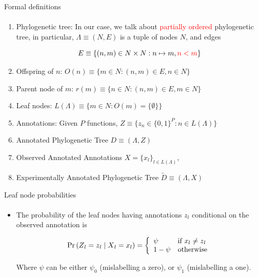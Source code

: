 \documentclass[9pt,handout,ignorenonframetext,]{beamer}
\newcommand{\Prcond}[2]{{\mbox{Pr}\left(#1\vphantom{#2}\;\right|\left.\vphantom{#1}#2\right)}}
\newcommand{\phylo}{\Lambda{}} %
\newcommand{\aphylo}{D{}}      %
\newcommand{\aphyloObs}{\tilde \aphylo{}} %
\newcommand{\Ann}{Z{}} %
\newcommand{\ann}{z{}} %
\newcommand{\AnnObs}{X{}}
\newcommand{\annObs}{x{}}
\newcommand{\Leaf}{L{}}
\begin{document}
\begin{frame}[t,label=formaldef]{Formal definitions}

\framesubtitle{\hyperlink{definitions}{}}

\begin{enumerate}
\def\labelenumi{\arabic{enumi}.}
\item
  Phylogenetic tree: In our case, we talk about
  \textcolor{red}{partially ordered} phylogenetic tree, in particular,
  \(\phylo\equiv (N,E)\) is a tuple of nodes \(N\), and edges

  \[
  E\equiv \{(n, m) \in N\times N: n\mapsto m, \textcolor{red}{n < m}\}
  \]
\item
  Offspring of \(n\): \(O(n)\equiv\{m\in N: (n, m) \in E, n\in N\}\)
\item
  Parent node of \(m\): \(r(m) \equiv\{n \in N: (n, m) \in E, m\in N\}\)
\item
  Leaf nodes: \(\Leaf(\phylo)\equiv \{m \in N: O(m)=\{\emptyset\}\}\)
\item
  Annotations: Given \(P\) functions,
  \(\Ann \equiv \{\ann_n \in \{0,1\}^P: n\in \Leaf(\phylo)\}\)
\item
  Annotated Phylogenetic Tree \(\aphylo \equiv(\phylo, \Ann)\)
\item
  Observed Annotated Annotations
  \(\AnnObs = \{\annObs_l\}_{l\in \Leaf(\phylo)}\),
\item
  Experimentally Annotated Phylogenetic Tree
  \(\aphyloObs\equiv(\phylo, \AnnObs)\)
\end{enumerate}

\end{frame}

\begin{frame}[t,label=leafnodesprob]{Leaf node probabilities}

\framesubtitle{\hyperlink{peelingalgorithm}{}}

\begin{itemize}
\item
  The probability of the leaf nodes having annotations \(\ann_l\)
  conditional on the observed annotation is

  \begin{equation}
  \label{eq:leaf1}
  \Prcond{\Ann_{l} = \ann_{l}}{\AnnObs_{l} = \annObs_{l}} = \left\{
  \begin{array}{ll}
  \psi &\mbox{if }\annObs_{l} \neq \ann_{l} \\
  1 - \psi & \mbox{otherwise}
  \end{array}
  \right.
  \end{equation}

  Where \(\psi\) can be either \(\psi_0\) (mislabelling a zero), or
  \(\psi_1\) (mislabelling a one).
\end{itemize}

\end{frame}
\end{document}
